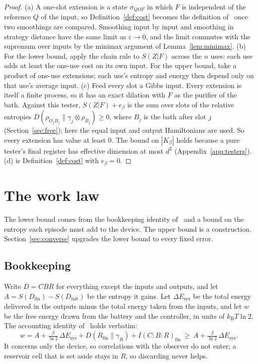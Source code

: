 \documentclass[11pt]{article}
\theoremstyle{definition}
\theoremstyle{remark}
\newcommand{\kB}{k_{\mathrm B}}
\newcommand{\Kb}{K_\beta}
\begin{document}
\begin{proof}
(a) A one-slot extension is a state $\sigma_{QOF}$ in which $F$ is independent of the reference $Q$ of the input, so Definition~\ref{def:cost} becomes the definition of~\cite{SaveWork} once two smoothings are compared. Smoothing input by input and smoothing in strategy distance have the same limit as $\varepsilon\to0$, and the limit commutes with the supremum over inputs by the minimax argument of Lemma~\ref{lem:minimax}. (b) For the lower bound, apply the chain rule to $S(Z|F)$ across the $n$ uses: each use adds at least the one-use cost on its own input. For the upper bound, take a product of one-use extensions; each use's entropy and energy then depend only on that use's average input. (c) Feed every slot a Gibbs input. Every extension is itself a finite process, so it has an exact dilation with $F$ as the purifier of the bath. Against this tester, $S(Z|F)+e_\beta$ is the sum over slots of the relative entropies $D(\rho_{O_jB_j}\|\gamma_j\otimes\rho_{B_j})\ge0$, where $B_j$ is the bath after slot $j$ (Section~\ref{sec:free}); here the equal input and output Hamiltonians are used. So every extension has value at least $0$. The bound on $|\Kb|$ holds because a pure tester's final register has effective dimension at most $d^2$ (Appendix~\ref{app:testers}). (d) is Definition~\ref{def:cost} with $e_\beta=0$.
\end{proof}

\section{The work law}\label{sec:law}

The lower bound comes from the bookkeeping identity of~\cite{SaveWork} and a bound on the entropy each episode must add to the device. The upper bound is a construction. Section~\ref{sec:converse} upgrades the lower bound to every fixed error.

\subsection{Bookkeeping}

Write $D=CBR$ for everything except the inputs and outputs, and let $A=S(D_{\mathrm{fin}})-S(D_{\mathrm{init}})$ be the entropy it gains. Let $\Delta E_{\mathrm{sys}}$ be the total energy delivered in the outputs minus the total energy taken from the inputs, and let $w$ be the free energy drawn from the battery and the controller, in units of $\kB T\ln2$. The accounting identity of~\cite{SaveWork} holds verbatim:
\begin{equation}\label{eq:accounting}
w=A+\tfrac{\beta}{\ln2}\,\Delta E_{\mathrm{sys}}+D(R_{\mathrm{fin}}\|\gamma_R)+I(C{:}B{:}R)_{\mathrm{fin}}\ \ge\ A+\tfrac{\beta}{\ln2}\,\Delta E_{\mathrm{sys}}.
\end{equation}
It concerns only the device, so correlations with the observer do not enter; a reservoir cell that is set aside stays in $R$, so discarding never helps.
\end{document}
